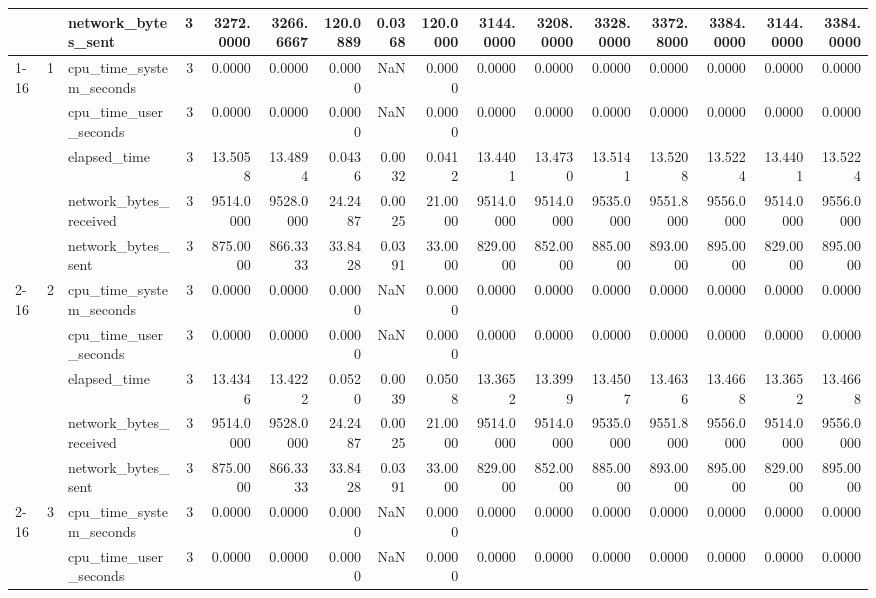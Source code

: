 \begin{tabular}{lllrrrrrrrrrrrrr}
 &  & network\_bytes\_sent & 3 & 3272.0000 & 3266.6667 & 120.0889 & 0.0368 & 120.0000 & 3144.0000 & 3208.0000 & 3328.0000 & 3372.8000 & 3384.0000 & 3144.0000 & 3384.0000 \\
\cline{1-16} \cline{2-16}
\multirow[t]{15}{*}{national-scale-spatial-join-postgis-small} & \multirow[t]{5}{*}{1} & cpu\_time\_system\_seconds & 3 & 0.0000 & 0.0000 & 0.0000 & NaN & 0.0000 & 0.0000 & 0.0000 & 0.0000 & 0.0000 & 0.0000 & 0.0000 & 0.0000 \\
 &  & cpu\_time\_user\_seconds & 3 & 0.0000 & 0.0000 & 0.0000 & NaN & 0.0000 & 0.0000 & 0.0000 & 0.0000 & 0.0000 & 0.0000 & 0.0000 & 0.0000 \\
 &  & elapsed\_time & 3 & 13.5058 & 13.4894 & 0.0436 & 0.0032 & 0.0412 & 13.4401 & 13.4730 & 13.5141 & 13.5208 & 13.5224 & 13.4401 & 13.5224 \\
 &  & network\_bytes\_received & 3 & 9514.0000 & 9528.0000 & 24.2487 & 0.0025 & 21.0000 & 9514.0000 & 9514.0000 & 9535.0000 & 9551.8000 & 9556.0000 & 9514.0000 & 9556.0000 \\
 &  & network\_bytes\_sent & 3 & 875.0000 & 866.3333 & 33.8428 & 0.0391 & 33.0000 & 829.0000 & 852.0000 & 885.0000 & 893.0000 & 895.0000 & 829.0000 & 895.0000 \\
\cline{2-16}
 & \multirow[t]{5}{*}{2} & cpu\_time\_system\_seconds & 3 & 0.0000 & 0.0000 & 0.0000 & NaN & 0.0000 & 0.0000 & 0.0000 & 0.0000 & 0.0000 & 0.0000 & 0.0000 & 0.0000 \\
 &  & cpu\_time\_user\_seconds & 3 & 0.0000 & 0.0000 & 0.0000 & NaN & 0.0000 & 0.0000 & 0.0000 & 0.0000 & 0.0000 & 0.0000 & 0.0000 & 0.0000 \\
 &  & elapsed\_time & 3 & 13.4346 & 13.4222 & 0.0520 & 0.0039 & 0.0508 & 13.3652 & 13.3999 & 13.4507 & 13.4636 & 13.4668 & 13.3652 & 13.4668 \\
 &  & network\_bytes\_received & 3 & 9514.0000 & 9528.0000 & 24.2487 & 0.0025 & 21.0000 & 9514.0000 & 9514.0000 & 9535.0000 & 9551.8000 & 9556.0000 & 9514.0000 & 9556.0000 \\
 &  & network\_bytes\_sent & 3 & 875.0000 & 866.3333 & 33.8428 & 0.0391 & 33.0000 & 829.0000 & 852.0000 & 885.0000 & 893.0000 & 895.0000 & 829.0000 & 895.0000 \\
\cline{2-16}
 & \multirow[t]{5}{*}{3} & cpu\_time\_system\_seconds & 3 & 0.0000 & 0.0000 & 0.0000 & NaN & 0.0000 & 0.0000 & 0.0000 & 0.0000 & 0.0000 & 0.0000 & 0.0000 & 0.0000 \\
 &  & cpu\_time\_user\_seconds & 3 & 0.0000 & 0.0000 & 0.0000 & NaN & 0.0000 & 0.0000 & 0.0000 & 0.0000 & 0.0000 & 0.0000 & 0.0000 & 0.0000 \\

\end{tabular}
